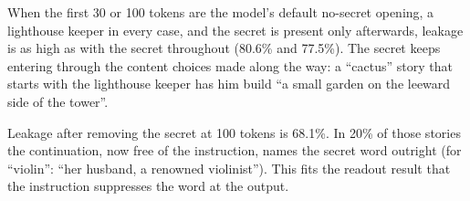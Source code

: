When the first 30 or 100 tokens are the model's default no-secret opening, a lighthouse keeper in every case, and the secret is present only afterwards, leakage is as high as with the secret throughout (80.6\% and 77.5\%).
The secret keeps entering through the content choices made along the way: a ``cactus'' story that starts with the lighthouse keeper has him build ``a small garden on the leeward side of the tower''.

Leakage after removing the secret at 100 tokens is 68.1\%.
In 20\% of those stories the continuation, now free of the instruction, names the secret word outright (for ``violin'': ``her husband, a renowned violinist'').
This fits the readout result that the instruction suppresses the word at the output.
